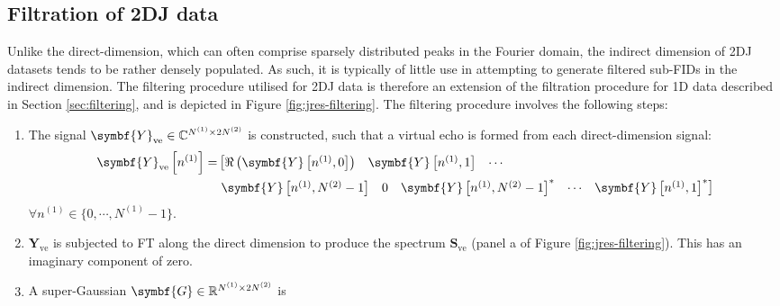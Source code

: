 \subsection{Filtration of \ac{2DJ} data}
Unlike the direct-dimension, which can often comprise sparsely distributed
peaks in the Fourier domain, the indirect dimension of \ac{2DJ} datasets tends
to be rather densely populated. As such, it is typically of little use in
attempting to generate filtered sub-\acp{FID} in the indirect dimension. The
filtering procedure utilised for \ac{2DJ} data is therefore an extension of the
filtration procedure for \ac{1D} data described in Section \ref{sec:filtering},
and is depicted in Figure \ref{fig:jres-filtering}. The filtering procedure
involves the following steps:
\begin{enumerate}
    \item The signal $\symbf{Y}_{\text{ve}} \in \mathbb{C}^{\None \times 2 \Ntwo}$ is
    constructed, such that a virtual echo is formed from each direct-dimension
    signal:
    \begin{equation}
        \begin{split}
            \symbf{Y}_{\text{ve}} \left[n^{(1)}\right] =
                &\left[
                \begin{matrix}
                    \Re\left(\symbf{Y}\left[n^{(1)}, 0\right]\right) &
                    \symbf{Y}\left[n^{(1)}, 1\right] &
                    \cdots
                \end{matrix}\right.
                \\
                &\left.
                \begin{matrix}
                    \symbf{Y}\left[n^{(1)}, \Ntwo - 1\right] &
                    0 &
                    \symbf{Y}\left[n^{(1)}, \Ntwo - 1\right]^* &
                    \cdots &
                    \symbf{Y}\left[n^{(1)}, 1\right]^*
                \end{matrix}
                \right]
        \end{split}
    \end{equation}
    $\forall n^{(1)} \in \lbrace 0, \cdots, N^{(1)} - 1 \rbrace$.
    \item $\symbf{Y}_{\text{ve}}$ is subjected to \ac{FT} along the direct
        dimension to produce the spectrum  $\symbf{S}_{\text{ve}}$ (panel a of
        Figure \ref{fig:jres-filtering}). This has an imaginary component of
        zero.
    \item A super-Gaussian $\symbf{G} \in \mathbb{R}^{\None \times 2 \Ntwo}$ is

\end{enumerate}
